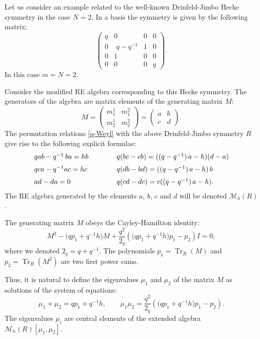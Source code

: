 \documentclass[11pt]{article}
\newcommand{\qq}{q^{-1}}
\DeclareMathOperator{\Tr}{Tr}
\newcommand{\Aqh}{\mathcal{M}_{h}(R)}
\numberwithin{equation}{section}
\theoremstyle{plain}
\theoremstyle{definition}
\begin{document}
Let us consider an example related to the well-known Drinfeld-Jimbo Hecke symmetry in the case $N=2$. In a  basis
the symmetry is given by the following matrix:
\begin{equation}
\left(\begin{array}{lcll}
	q&0&0&0\\
	0&\,\,q-\qq&1&0\\
	0&1&0&0\\
	0&0&0&q
	\end{array} \right).
\end{equation}
In this case  $m=N=2$.

Consider the  modified RE algebra corresponding to this Hecke symmetry. The generators of the algebra are matrix
elements of the generating matrix $M$:
\begin{equation}
M = \left(\begin{array}{ll}
	m_1^1&m_1^2\\
	m_2^1& m_2^2 \end{array} \right)=\left(\begin{array}{ll}
	a&b\\
	c&d
\end{array} \right).
\label{matt}
\end{equation}
The permutation relations \eqref{q-Weyl} with the above Drinfeld-Jimbo symmetry $R$ give rise to the following explicit formulae:
\[
\begin{array}{lcl}
q ab-q^{-1}\, ba=hb &\qquad& q (bc-cb)=((q-\qq)\,a-h)(d-a)\\
\rule{0pt}{5mm}
q ca-q^{-1}ac=h c&& q (db-bd)=((q-\qq)\, a -h)\, b\\
\rule{0pt}{5mm}
ad-da=0&&q(cd-dc)=c((q-\qq)\, a-h).
\end{array}
\]
The RE algebra generated by the elements $a$, $b$, $c$ and $d$ will be denoted $\Aqh$.

The generating matrix $M$ obeys the Cayley-Hamiltion identity:
\[
M^2-\bigl(qp_1+q^{-1}h\bigr)M +\frac{q^2}{2_q} \left(\bigl(qp_1+q^{-1}h\bigr)p_1-p_2\right)I=0,
\]
where we denoted $2_q = q+q^{-1}$. The polynomials $p_1 = \Tr_R(M)$ and $p_2 = \Tr_R(M^2)$ are two first power sums.

Thus, it is natural to define the eigenvalues $\mu_1$ and $\mu_2$ of the matrix $M$ as solutions of the system of equations:
\begin{equation}
\mu_1+\mu_2=qp_1+q^{-1}h,\qquad \mu_1\mu_2 = \frac{q^2}{2_q}
\left(\bigl(qp_1+q^{-1}h\bigr)p_1-p_2\right).
\label{def-mu}
\end{equation}
The eigenvalues $\mu_i$ are central elements of the extended algebra $\Aqh[\mu_1,\mu_2]$.
\end{document}
